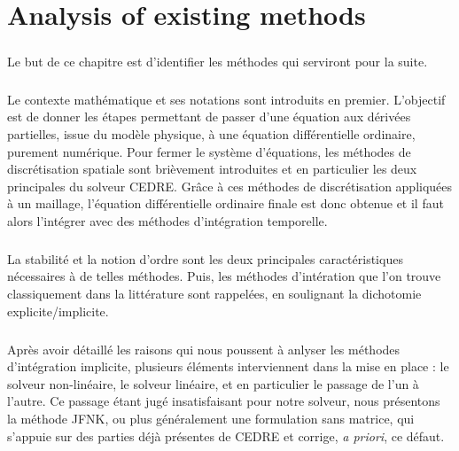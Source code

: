 \chapter{Analysis of existing methods}

\begin{tcolorbox}[title=Résumé du chapitre : Analyse des méthodes existantes, colframe=black!50!white]
  \paragraph{}
  Le but de ce chapitre est d'identifier les méthodes qui serviront pour la suite.

  \paragraph{}
  Le contexte mathématique et ses notations sont introduits en premier. L'objectif est de donner les
  étapes permettant de passer d'une équation aux dérivées partielles, issue du modèle physique, à une équation différentielle ordinaire, purement numérique. Pour fermer le système d'équations, les méthodes de
  discrétisation spatiale sont brièvement introduites et en particulier les deux principales du solveur CEDRE.
  Grâce à ces méthodes de discrétisation appliquées à un maillage, l'équation différentielle ordinaire finale est donc obtenue et il faut alors l'intégrer avec des méthodes d'intégration temporelle.

  \paragraph{}
  La stabilité et la notion d'ordre sont les deux principales caractéristiques nécessaires à de telles méthodes.
  Puis, les méthodes d'intération que l'on trouve classiquement dans la littérature sont rappelées, en soulignant la dichotomie explicite/implicite.

  \paragraph{}
  Après avoir détaillé les raisons qui nous poussent à anlyser les méthodes d'intégration implicite, plusieurs éléments interviennent dans la mise en place : le solveur non-linéaire, le solveur linéaire, et en particulier le passage de l'un à l'autre.
  Ce passage étant jugé insatisfaisant pour notre solveur, nous présentons la méthode JFNK, ou plus généralement une formulation sans matrice, qui s'appuie sur des parties déjà présentes de CEDRE et corrige, {\it a priori}, ce défaut.
\end{tcolorbox}


